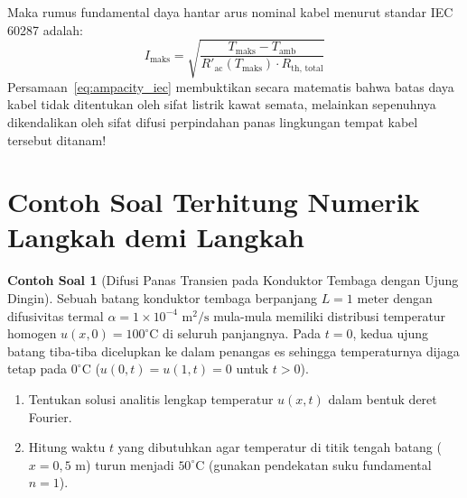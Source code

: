 \documentclass[11pt,a4paper]{article}
\theoremstyle{definition}
\newtheorem{example}{Contoh Soal}[section]
\begin{document}
Maka rumus fundamental daya hantar arus nominal kabel menurut standar IEC 60287 adalah:
\begin{equation}
    I_{\text{maks}} = \sqrt{\frac{T_{\text{maks}} - T_{\text{amb}}}{R'_{\text{ac}}(T_{\text{maks}}) \cdot R_{\text{th, total}}}}
    \label{eq:ampacity_iec}
\end{equation}
Persamaan~\eqref{eq:ampacity_iec} membuktikan secara matematis bahwa batas daya kabel tidak ditentukan oleh sifat listrik kawat semata, melainkan sepenuhnya dikendalikan oleh sifat difusi perpindahan panas lingkungan tempat kabel tersebut ditanam!

\section{Contoh Soal Terhitung Numerik Langkah demi Langkah}

\begin{example}[Difusi Panas Transien pada Konduktor Tembaga dengan Ujung Dingin]
Sebuah batang konduktor tembaga berpanjang $L = 1\text{ meter}$ dengan difusivitas termal $\alpha = 1 \times 10^{-4}\text{ m}^2/\text{s}$ mula-mula memiliki distribusi temperatur homogen $u(x, 0) = 100^\circ\text{C}$ di seluruh panjangnya. Pada $t = 0$, kedua ujung batang tiba-tiba dicelupkan ke dalam penangas es sehingga temperaturnya dijaga tetap pada $0^\circ\text{C}$ ($u(0, t) = u(1, t) = 0$ untuk $t > 0$).
\begin{enumerate}[leftmargin=*]
    \item Tentukan solusi analitis lengkap temperatur $u(x, t)$ dalam bentuk deret Fourier.
    \item Hitung waktu $t$ yang dibutuhkan agar temperatur di titik tengah batang ($x = 0{,}5\text{ m}$) turun menjadi $50^\circ\text{C}$ (gunakan pendekatan suku fundamental $n = 1$).
\end{enumerate}
\end{example}
\end{document}
